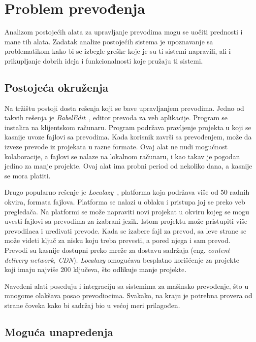 \section{Problem prevođenja}\label{ch:analiza}

Analizom postojećih alata za upravljanje prevodima mogu se uočiti prednosti i mane tih alata. 
Zadatak analize postojećih sistema je upoznavanje sa problematikom kako bi se izbegle greške
koje je su ti sistemi napravili, ali i prikupljanje dobrih ideja i funkcionalnosti koje pružaju ti sistemi.


\subsection{Postojeća okruženja}\label{sec:analiza-postojeca_okruzenja}

Na tržištu postoji dosta rešenja koji se bave upravljanjem prevodima. Jedno od takvih rešenja je 
\textit{BabelEdit}~\cite{BabelEdit}, editor prevoda za veb aplikacije. Program se instalira na klijentskom računaru.
Program podržava pravljenje projekta u koji se kasnije uvoze fajlovi sa prevodima. Kada korisnik završi 
sa prevođenjem, može da izveze prevode iz projekata u razne formate. Ovaj alat ne nudi mogućnost kolaboracije,
a fajlovi se nalaze na lokalnom računaru, i kao takav je pogodan jedino za manje projekte. Ovaj alat ima 
probni period od nekoliko dana, a kasnije se mora platiti.

Drugo popularno rešenje je \textit{Localazy}~\cite{Localazy}, platforma koja podržava više od 50 radnih okvira, 
formata fajlova. Platforma se nalazi u oblaku i pristupa joj se preko veb pregledača. Na platformi se može 
napraviti novi projekat u okviru kojeg se mogu uvesti fajlovi sa prevodima za izabrani jezik. Istom projektu 
može pristupiti više prevodilaca i uređivati prevode. Kada se izabere fajl za prevod, sa leve strane se može 
videti ključ za nisku koju treba prevesti, a pored njega i sam prevod. Prevodi su kasnije dostupni preko 
mreže za dostavu sadržaja (eng. \textit{content delivery network, CDN}). \textit{Localazy} omogućava besplatno korišćenje za 
projekte koji imaju najviše 200 ključeva, što odlikuje manje projekte.

Navedeni alati poseduju i integraciju sa sistemima za mašinsko prevođenje, što u mnogome olakšava posao 
prevodiocima. Svakako, na kraju je potrebna provera od strane čoveka kako bi sadržaj bio u većoj meri prilagođen. 


\subsection{Moguća unapređenja}\label{sec:analiza-moguca_unapredjenja}

